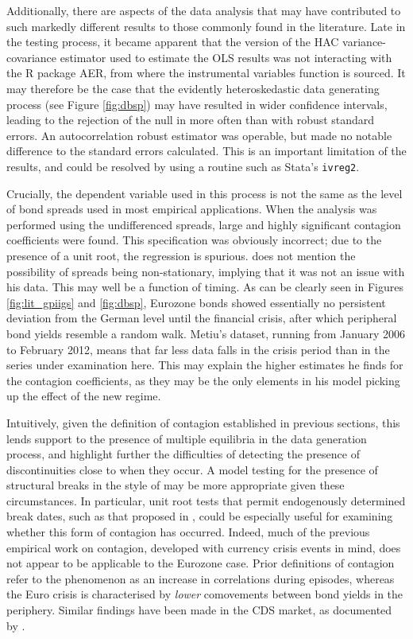 \documentclass[/../base.tex]{subfiles}
\begin{document}
Additionally, there are aspects of the data analysis that may have contributed to such markedly different results to those commonly found in the literature. Late in the testing process, it became apparent that the version of the HAC variance-covariance estimator used to estimate the OLS results was not interacting with the R package AER, from where the instrumental variables function is sourced. It may therefore be the case that the evidently heteroskedastic data generating process (see Figure \ref{fig:dbsp}) may have resulted in wider confidence intervals, leading to the rejection of the null in more often than with robust standard errors. An autocorrelation robust estimator was operable, but made no notable difference to the standard errors calculated. This is an important limitation of the results, and could be resolved by using a routine such as Stata's \texttt{ivreg2}.  

Crucially, the dependent variable used in this process is not the same as the level of bond spreads used in most empirical applications. When the analysis was performed using the undifferenced spreads, large and highly significant contagion coefficients were found. This specification was obviously incorrect; due to the presence of a unit root, the regression is spurious. \cite{metiu2012sovereign} does not mention the possibility of spreads being non-stationary, implying that it was not an issue with his data. This may well be a function of timing. As can be clearly seen in Figures \ref{fig:lit_gpiigs} and \ref{fig:dbsp}, Eurozone bonds showed essentially no persistent deviation from the German level until the financial crisis, after which peripheral bond yields resemble a random walk. Metiu's dataset, running from January 2006 to February 2012, means that far less data falls in the crisis period than in the series under examination here. This may explain the higher estimates he finds for the contagion coefficients, as they may be the only elements in his model picking up the effect of the new regime. 


Intuitively, given the definition of contagion established in previous sections, this lends support to the presence of multiple equilibria in the data generation process, and highlight further the difficulties of detecting the presence of discontinuities close to when they occur. A model testing for the presence of structural breaks in the style of \cite{bai1998estimating} may be more appropriate given these circumstances. In particular, unit root tests that permit endogenously determined break dates, such as that proposed in \cite{zivot1992further}, could be especially useful for examining whether this form of contagion has occurred. Indeed, much of the previous empirical work on contagion, developed with currency crisis events in mind, does not appear to be applicable to the Eurozone case. Prior definitions of contagion refer to the phenomenon as an increase in correlations during episodes, whereas the Euro crisis is characterised by \textit{lower} comovements between bond yields in the periphery. Similar findings have been made in the CDS market, as documented by \cite{caporin2013measuring}. 
\end{document}

